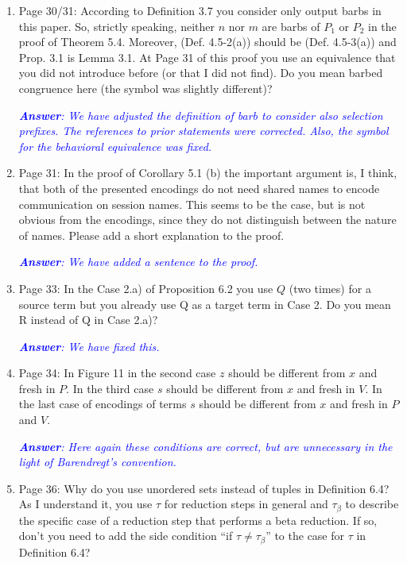\documentclass[11pt,a4paper]{article}
\newcommand{\answ}[1]{\smallskip \emph{\textcolor{blue}{\textbf{Answer}:  #1}}}
\begin{document}
\begin{enumerate}
  \answ{We have fixed this.}
  
\item Page 30/31: According to Definition 3.7 you consider only output barbs in this
  paper. So, strictly speaking, neither $n$ nor $m$ are barbs of $P_1$ or $P_2$ in the
  proof of Theorem 5.4. Moreover, (Def. 4.5-2(a)) should be (Def. 4.5-3(a)) and
  Prop. 3.1 is Lemma 3.1. At Page 31 of this proof you use an equivalence that
  you did not introduce before (or that I did not find). Do you mean barbed
  congruence here (the symbol was slightly different)?
  
  \answ{We have adjusted the definition of barb to consider also selection prefixes. The references to prior statements were corrected. Also, the symbol for the behavioral equivalence was fixed.}
  
\item  Page 31: In the proof of Corollary 5.1 (b) the important argument is, I think,
  that both of the presented encodings do not need shared names to encode
  communication on session names. This seems to be the case, but is not obvious
  from the encodings, since they do not distinguish between the nature of names.
  Please add a short explanation to the proof.
  
  \answ{We have added a sentence to the proof.}
  
\item  Page 33: In the Case 2.a) of Proposition 6.2 you use $Q$ (two times) for a
  source term but you already use Q as a target term in Case 2. Do you mean R
  instead of Q in Case 2.a)?
  
  \answ{We have fixed this.}
  
\item  Page 34: In Figure 11 in the second case $z$ should be different from $x$ and
  fresh in $P$. In the third case $s$ should be different from $x$ and fresh in $V$.
  In the last case of encodings of terms $s$ should be different from $x$ and fresh
  in $P$ and $V$.
  
  \answ{Here again these conditions are correct, but are unnecessary in the light of Barendregt's convention.}
  
\item  Page 36: Why do you use unordered sets instead of tuples in Definition 6.4?
  As I understand it, you use $\tau$ for reduction steps in general and $\tau_\beta$
  to describe the specific case of a reduction step that performs a beta
  reduction. If so, don't you need to add the side condition
  ``if $\tau \neq \tau_\beta$'' to the case for $\tau$ in Definition 6.4?
  

\end{enumerate}
\end{document}
